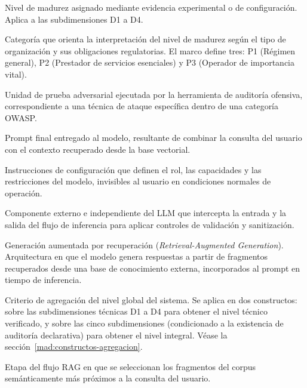 \begin{description}[leftmargin=0pt, style=nextline]
  \item[Nivel verificado] Nivel de madurez asignado mediante evidencia experimental o de configuración. Aplica a las subdimensiones D1 a D4.

  \item[Perfil organizacional] Categoría que orienta la interpretación del nivel de madurez según el tipo de organización y sus obligaciones regulatorias. El marco define tres: P1 (Régimen general), P2 (Prestador de servicios esenciales) y P3 (Operador de importancia vital).

  \item[Probe] Unidad de prueba adversarial ejecutada por la herramienta de auditoría ofensiva, correspondiente a una técnica de ataque específica dentro de una categoría OWASP.

  \item[Prompt aumentado] Prompt final entregado al modelo, resultante de combinar la consulta del usuario con el contexto recuperado desde la base vectorial.

  \item[Prompt del sistema] Instrucciones de configuración que definen el rol, las capacidades y las restricciones del modelo, invisibles al usuario en condiciones normales de operación.

  \item[Proxy de seguridad] Componente externo e independiente del LLM que intercepta la entrada y la salida del flujo de inferencia para aplicar controles de validación y sanitización.

  \item[RAG] Generación aumentada por recuperación (\emph{Retrieval-Augmented Generation}). Arquitectura en que el modelo genera respuestas a partir de fragmentos recuperados desde una base de conocimiento externa, incorporados al prompt en tiempo de inferencia.

  \item[Regla de piso mínimo] Criterio de agregación del nivel global del sistema. Se aplica en dos constructos: sobre las subdimensiones técnicas D1 a D4 para obtener el nivel técnico verificado, y sobre las cinco subdimensiones (condicionado a la existencia de auditoría declarativa) para obtener el nivel integral. Véase la sección~\ref{mad:constructos-agregacion}.

  \item[Retrieval] Etapa del flujo RAG en que se seleccionan los fragmentos del corpus semánticamente más próximos a la consulta del usuario.


\end{description}
